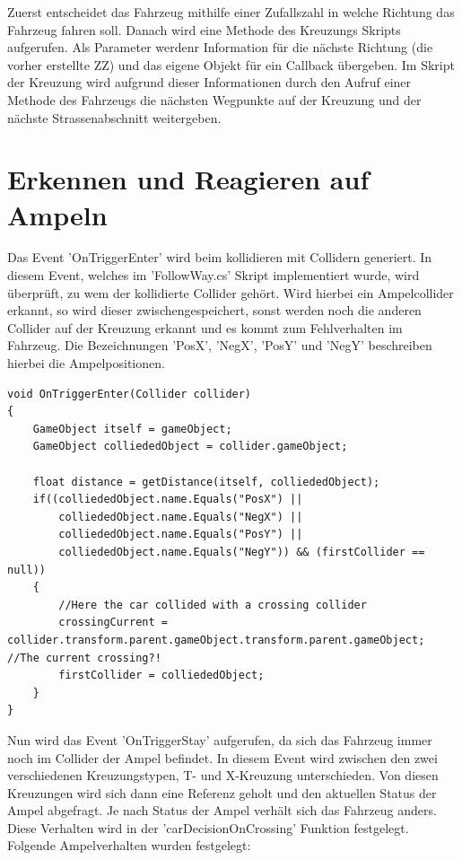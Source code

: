 Zuerst entscheidet das Fahrzeug mithilfe einer Zufallszahl in welche Richtung das Fahrzeug fahren soll. Danach wird eine Methode des Kreuzungs Skripts aufgerufen. Als Parameter werdenr Information für die nächste Richtung (die vorher erstellte ZZ) und das eigene Objekt für ein Callback übergeben.
Im Skript der Kreuzung wird aufgrund dieser Informationen durch den Aufruf einer Methode des Fahrzeugs die nächsten Wegpunkte auf der Kreuzung und der nächste Strassenabschnitt weitergeben.
% 

\section{Erkennen und Reagieren auf Ampeln}
\label{Erkennen_und_Reagieren_auf_Ampeln}

Das Event 'OnTriggerEnter' wird beim kollidieren mit Collidern generiert. In diesem Event, welches im 'FollowWay.cs' Skript implementiert wurde, wird überprüft, zu wem der kollidierte Collider gehört. Wird hierbei ein Ampelcollider erkannt, so wird dieser zwischengespeichert, sonst werden noch die anderen Collider auf der Kreuzung erkannt und es kommt zum Fehlverhalten im Fahrzeug. Die Bezeichnungen 'PosX', 'NegX', 'PosY' und 'NegY' beschreiben hierbei die Ampelpositionen.

\begin{lstlisting}[caption={Erstes erkennen einer Ampel},label={lst:ampel_erkennen}]
void OnTriggerEnter(Collider collider)
{
	GameObject itself = gameObject;
	GameObject colliededObject = collider.gameObject;

	float distance = getDistance(itself, colliededObject);
	if((colliededObject.name.Equals("PosX") ||
		colliededObject.name.Equals("NegX") ||
		colliededObject.name.Equals("PosY") ||
		colliededObject.name.Equals("NegY")) && (firstCollider == null))
	{
		//Here the car collided with a crossing collider
		crossingCurrent = collider.transform.parent.gameObject.transform.parent.gameObject; //The current crossing?!
		firstCollider = colliededObject;
	}
}
\end{lstlisting}

Nun wird das Event 'OnTriggerStay' aufgerufen, da sich das Fahrzeug immer noch im Collider der Ampel befindet. In diesem Event wird zwischen den zwei verschiedenen Kreuzungstypen, T- und X-Kreuzung unterschieden. Von diesen Kreuzungen wird sich dann eine Referenz geholt und den aktuellen Status der Ampel abgefragt. Je nach Status der Ampel verhält sich das Fahrzeug anders. Diese Verhalten wird in der 'carDecisionOnCrossing' Funktion festgelegt. Folgende Ampelverhalten wurden festgelegt:


